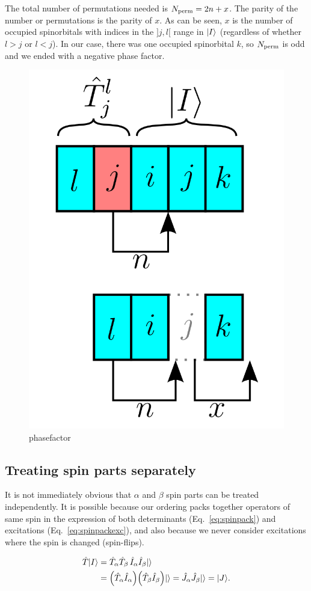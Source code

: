 \documentclass[./thesis.tex]{subfiles}
\begin{document}
The total number of permutations needed is ${N_\text{perm}} = 2n+x$. The parity of the number or permutations is the parity of $x$. As can be seen, $x$ is the number of occupied spinorbitals with indices in the $]j, l[$ range in ${\ket{I}}$ (regardless of whether $l>j$ or $l<j$). In our case, there was one occupied spinorbital $k$, so ${N_\text{perm}}$ is odd and we ended with a negative phase factor.

\begin{figure}[h!]
	\begin{center}
		\includegraphics[width=0.3\columnwidth]{figures/determinant_driven/phasefactor}
		\caption{
		\label{phasefactor}
		phasefactor
		}
	\end{center}
\end{figure}

\subsection{Treating spin parts separately}

It is not immediately obvious that $\alpha$ and $\beta$ spin parts can be treated independently. It is possible because our ordering packs together operators of same spin in the expression of both determinants (Eq.~\eqref{eq:spinpack}) and excitations (Eq.~\eqref{eq:spinpackexc}), and 
also because we never consider excitations where the spin is changed (spin-flips).

\begin{align}
\label{eq:spin1}
\hat{T} {\ket{I}} & = \hat{T}_\alpha \hat{T}_\beta \,  \hat{I}_\alpha \hat{I}_\beta {\ket{}} \\
\label{eq:spin2}
            & =  \qty(\hat{T}_\alpha \hat{I}_\alpha) \qty(\hat{T}_\beta  \hat{I}_\beta) {\ket{}} 
              = \hat{J}_\alpha \hat{J}_\beta  {\ket{}} = {\ket{J}}.
\end{align}
\end{document}
